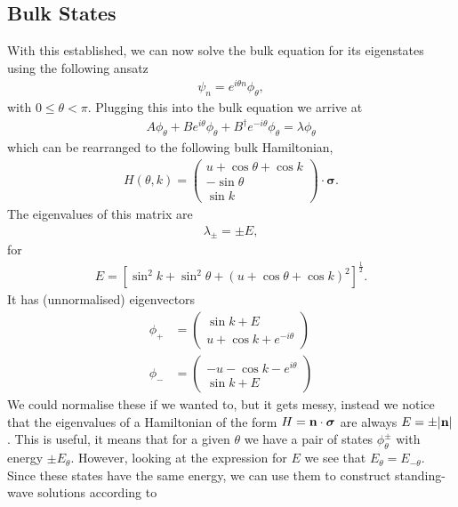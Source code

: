 \subsection{Bulk States}
With this established, we can now solve the bulk equation for its eigenstates using the following ansatz
\begin{align}
    \psi_n = e^{i\theta n}\phi_{\theta},
\end{align}
with $0 \leq \theta < \pi$. Plugging this into the bulk equation we arrive at
\begin{align}
    A\phi_{\theta} + Be^{i\theta}\phi_{\theta} + B^\dag e^{-i\theta} \phi_{\theta} = \lambda \phi_{\theta}
\end{align}
which can be rearranged to the following bulk Hamiltonian,
\begin{align}
    H(\theta, k) = \begin{pmatrix}
 u + \cos \theta+ \cos k \\ 
- \sin \theta\\ 
 \sin k
\end{pmatrix} \cdot \bm \sigma.
\end{align}
The eigenvalues of this matrix are
\begin{align}
    \lambda_{\pm} = \pm E,
\end{align}
for
\begin{align}
    E = \left [ \sin^2 k + \sin^2 \theta  + \left ( u + \cos \theta+ \cos k \right)^2 \right ]^{\frac{1}{2}}.
\end{align}
It has (unnormalised) eigenvectors
\begin{align}\label{eigenvectors}
    \phi_+ &= \begin{pmatrix}
\sin k + E\\
u + \cos k + e^{-i\theta}
\end{pmatrix}\\ 
    \phi_- &=\begin{pmatrix}
-u -  \cos k - e^{i\theta}\\
\sin k + E
\end{pmatrix}
\end{align}
We could normalise these if we wanted to, but it gets messy, instead we notice that the eigenvalues of a Hamiltonian of the form $H = \bf n \cdot \bm \sigma$ are always $E = \pm |\bf n |$. This is useful, it means that for a given $\theta$ we have a pair of states $ \phi_\theta ^\pm$ with energy $\pm E_\theta$. However, looking at the expression for $E$ we see that $E_\theta = E_{-\theta}$. Since these states have the same energy, we can use them to construct standing-wave solutions according to
